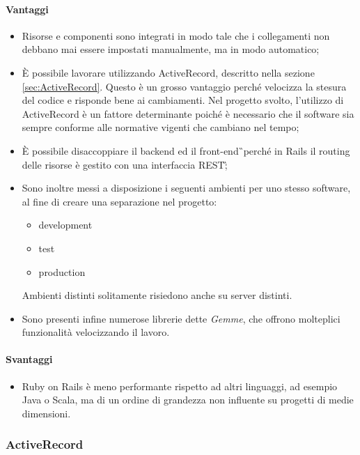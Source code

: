 \paragraph{Vantaggi}
\begin{itemize}
	\item Risorse e componenti sono integrati in modo tale che i collegamenti non debbano mai essere impostati manualmente, ma in modo automatico;
	\item È possibile lavorare utilizzando ActiveRecord, descritto nella sezione \ref{sec:ActiveRecord}. Questo è un grosso vantaggio perché velocizza la stesura del codice e risponde bene ai cambiamenti. Nel progetto svolto, l'utilizzo di ActiveRecord è un fattore determinante poiché è necessario che il software sia sempre conforme alle normative vigenti che cambiano nel tempo;
	\item È possibile disaccoppiare il backend ed il \gls{front-end}\G\ perché in Rails il routing delle risorse è gestito con una interfaccia \gls{REST}\G;
	\item Sono inoltre messi a disposizione i seguenti ambienti per uno stesso software, al fine di creare una separazione nel progetto:
		\begin{itemize}
		\item development 
		\item test
		\item production
		\end{itemize} 
		Ambienti distinti solitamente risiedono anche su server distinti.
	\item Sono presenti infine numerose librerie dette \textit{Gemme}, che offrono molteplici funzionalità velocizzando il lavoro.
\end{itemize}
\paragraph{Svantaggi}
	\begin{itemize}
		\item Ruby on Rails è meno performante rispetto ad altri linguaggi, ad esempio Java o Scala, ma di un ordine di grandezza non influente su progetti di medie dimensioni. 
	\end{itemize} 
		
\subsubsection{ActiveRecord}

